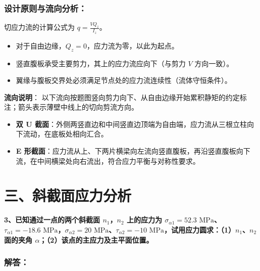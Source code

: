 \documentclass[11pt,a4paper]{ctexrep}
\begin{document}
{\begin{center}
\end{center}

\subsubsection*{设计原则与流向分析：}
切应力流的计算公式为 $q = \frac{V Q_z}{I_z}$。
\begin{itemize}
    \item 对于自由边缘，$Q_z = 0$，应力流为零，以此为起点。
    \item 竖直腹板承受主要剪力，其上的应力流应向下（与剪力 $V$ 方向一致）。
    \item 翼缘与腹板交界处必须满足节点处的应力流连续性（流体守恒条件）。
\end{itemize}
\textbf{流向说明}：
以下流向按题图竖向剪力向下、从自由边缘开始累积静矩的约定标注；箭头表示薄壁中线上的切向剪流方向。
\begin{itemize}
    \item \textbf{双 U 截面}：外侧两竖直边和中间竖直边顶端为自由端，应力流从三根立柱向下流动，在底板处相向汇合。
    \item \textbf{E 形截面}：应力流从上、下两片横梁向左流向竖直腹板，再沿竖直腹板向下流，在中间横梁处向右流出，符合应力平衡与对称性要求。
\end{itemize}




\section*{三、斜截面应力分析}

\textbf{3、已知通过一点的两个斜截面 $n_1$，$n_2$ 上的应力为 $\sigma_{\alpha 1}=52.3\text{ MPa}$、$\tau_{\alpha 1}=-18.6\text{ MPa}$，$\sigma_{\alpha 2}=20\text{ MPa}$、$\tau_{\alpha 2}=-10\text{ MPa}$，试用应力圆求：（1）$n_1$、$n_2$ 面的夹角 $\alpha$；（2）该点的主应力及主平面位置。}

\subsubsection*{解答：}

}
\end{document}
